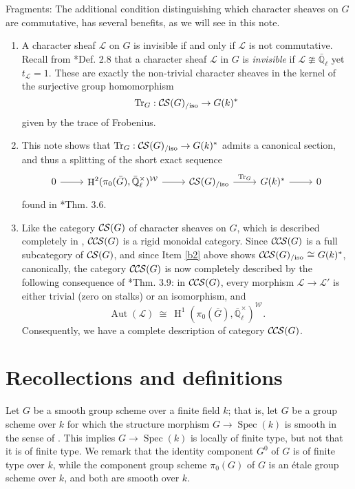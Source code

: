 \documentclass[10pt]{amsart}
\makeatletter
\theoremstyle{plain}
\theoremstyle{definition}
\newcommand{\EE}{\mathbb{\bar Q}_\ell}
\newcommand{\Fq}{k}
\newcommand{\EEx}{\EE^\times}
\newcommand{\Weil}[1]{\mathcal{W}_{#1}}
\DeclareMathOperator{\Aut}{Aut}
\DeclareMathOperator{\Hh}{H}
\newcommand{\Spec}[1]{{\operatorname{Spec}(#1)}}
\newcommand{\iso}{{\ \cong\ }}
\newcommand{\trFrob}[1]{t_{#1}}
\newcommand{\TrFrob}[1]{\operatorname{Tr}_{#1}}
\newcommand{\cs}[1]{{\mathcal{#1}}}
\newcommand{\CS}{{\mathcal{C\hskip-0.8pt S}}}
\newcommand{\CCS}{{\mathcal{C\hskip-.8pt C\hskip-0.8pt S}}}
\newcommand{\CSiso}[1]{\CS(#1)_{/\text{iso}}}
\newcommand{\CCSiso}[1]{\CCS(#1)_{/\text{iso}}}
\newcommand{\labitem}[2]{
\def\@itemlabel{\textbf{#1}}
\item
\def\@currentlabel{#1}\label{#2}}
\newcommand{\bG}{\bar{G}}
\makeatother
\begin{document}
Fragments: 
The additional condition distinguishing which character sheaves on $G$ are commutative, has several benefits, as we will see in this note.
\begin{enumerate}
\labitem{(1)}{b1}
A character sheaf $\cs{L}$ on $G$ is invisible if and only if $\cs{L}$ is not commutative.
Recall from \cite{cunningham-roe:13a}*{Def. 2.8} that a character sheaf $\cs{L}$ in $G$ is {\it invisible} if $\cs{L}  \ncong \EE$ yet $\trFrob{\cs{L}} =1$.
These are exactly the non-trivial character sheaves in the kernel of the surjective group homomorphism 
\[
\TrFrob{G} : \CSiso{G} \to G(\Fq)^*
\]
 given by the trace of Frobenius.
\labitem{(2)}{b2}
This note shows that $\TrFrob{G} : \CSiso{G} \to G(\Fq)^*$ admits a canonical section, and thus a splitting of the short exact sequence 
\[
\begin{tikzcd}
0 \arrow{r} & \Hh^2(\pi_0(\bG),\EEx)^{\Weil{}} \arrow{r} & \CSiso{G} \arrow{r}{\TrFrob{G}} & G(\Fq)^* \arrow{r} & 0
\end{tikzcd}
\]
found in \cite{cunningham-roe:13a}*{Thm. 3.6}.
\labitem{(3)}{b3}
Like the category $\CS(G)$ of character sheaves on $G$, which is described completely in \cite{cunningham-roe:13a}, $\CCS(G)$ is a rigid monoidal category.
Since $\CCS(G)$ is a full subcategory of $\CS(G)$, and since Item \ref{b2} above shows $\CCSiso{G} \iso G(\Fq)^*$, canonically, the category $\CCS(G)$ is now completely described by the following consequence of \cite{cunningham-roe:13a}*{Thm. 3.9}: in $\CCS(G)$, every morphism $\cs{L} \to \cs{L}'$ is either trivial (zero on stalks) or an isomorphism, and
\[
\Aut(\cs{L}) \iso  \Hh^1(\pi_0(\bG), \EEx)^{\Weil{}}.
\]
Consequently, we have a complete description of category $\CCS(G)$.
\end{enumerate}




\section{Recollections and definitions} \label{sec:defs}

Let $G$ be a smooth group scheme over a finite field $\Fq$; that is, let $G$ be a group scheme over $\Fq$
for which the structure morphism $G \to \Spec{\Fq}$ is smooth in the sense of .
This implies $G \to \Spec{\Fq}$ is locally of finite type, but not that it is of finite type.
We remark that the identity component $G^0$ of $G$ is of finite type over $\Fq$, while the component group scheme
$\pi_0(G)$ of $G$ is an \'etale group scheme over $\Fq$, and both are smooth over $\Fq$.
\end{document}
